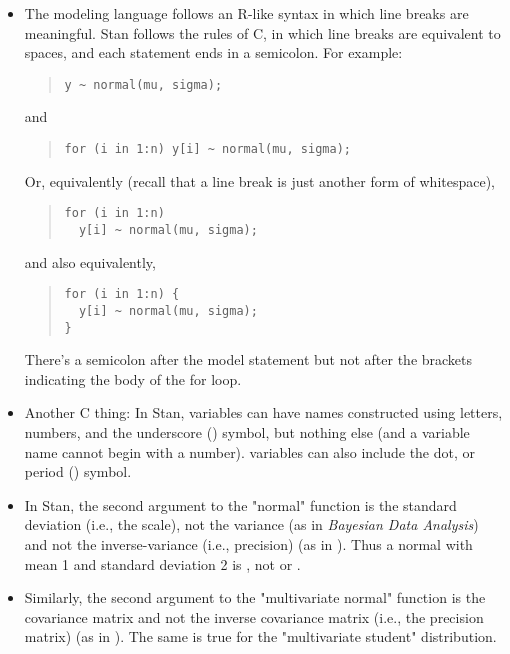 \begin{itemize}
\item The \BUGS modeling language follows an R-like syntax in which
  line breaks are meaningful.  Stan follows the rules of C, in which
  line breaks are equivalent to spaces, and each statement ends in a
  semicolon.  For example:
%
\begin{quote}
\begin{Verbatim}
y ~ normal(mu, sigma);
\end{Verbatim}
\end{quote}
%
and
%
\begin{quote}
\begin{Verbatim}
for (i in 1:n) y[i] ~ normal(mu, sigma);
\end{Verbatim}
\end{quote}
%
Or, equivalently (recall that a line break is just another form of whitespace),
%
\begin{quote}
\begin{Verbatim}
for (i in 1:n)
  y[i] ~ normal(mu, sigma);
\end{Verbatim}
\end{quote}
%
and also equivalently, 
%
\begin{quote}
\begin{Verbatim}
for (i in 1:n) {
  y[i] ~ normal(mu, sigma);
}
\end{Verbatim}
\end{quote}
%
There's a semicolon after the model statement but not after the
brackets indicating the body of the for loop.
%
\item Another C thing: In Stan, variables can have names constructed
  using letters, numbers, and the underscore (\code{\_}) symbol, but
  nothing else (and a variable name cannot begin with a number).
  \BUGS variables can also include the dot, or period () symbol.
%
\item In Stan, the second argument to the "normal" function is the
  standard deviation (i.e., the scale), not the variance (as in {\it
    Bayesian Data Analysis}) and not the inverse-variance (i.e.,
  precision) (as in \BUGS).  Thus a normal with mean 1 and standard
  deviation 2 is , not  or
  .
%
\item Similarly, the second argument to the "multivariate normal" 
  function is the covariance matrix and not the inverse covariance matrix
  (i.e., the precision matrix) (as in \BUGS). The same is true for
  the "multivariate student" distribution.
%  

\end{itemize}
